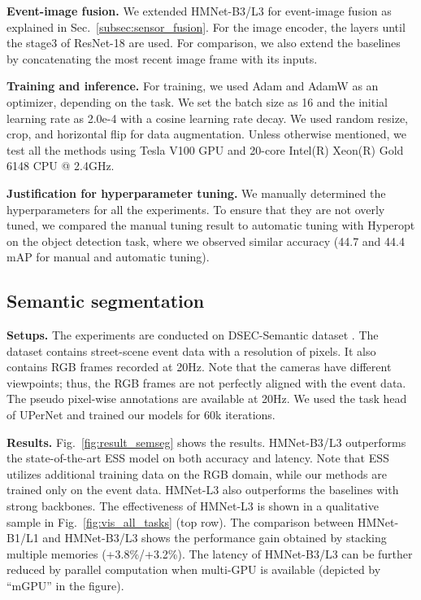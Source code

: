 \vspace{0.1cm}
\noindent
\textbf{Event-image fusion.}
We extended HMNet-B3/L3 for event-image fusion as explained in Sec.~\ref{subsec:sensor_fusion}.
For the image encoder, the layers until the stage3 of ResNet-18 \cite{He2016} are used.
For comparison, we also extend the baselines by concatenating the most recent image frame with its inputs.


\vspace{0.1cm}
\noindent
\textbf{Training and inference.}
For training, we used Adam \cite{Kingma2015} and AdamW \cite{Loshchilov2019} as an optimizer, depending on the task. We set the batch size as 16 and the initial learning rate as 2.0e-4 with a cosine learning rate decay.
We used random resize, crop, and horizontal flip for data augmentation.
Unless otherwise mentioned, we test all the methods using Tesla V100 GPU and 20-core Intel(R) Xeon(R) Gold 6148 CPU @ 2.4GHz.

\vspace{0.1cm}
\noindent
\textbf{Justification for hyperparameter tuning.}
We manually determined the hyperparameters for all the experiments.
To ensure that they are not overly tuned, we compared the manual tuning result to automatic tuning with Hyperopt \cite{Bergstra2013} on the object detection task, where we observed similar accuracy (44.7 and 44.4 mAP for manual and automatic tuning).



\subsection{Semantic segmentation}
\label{sec:semantic_segmentation}

\noindent
\textbf{Setups.}
The experiments are conducted on DSEC-Semantic dataset \cite{Sun2022}.
The dataset contains street-scene event data with a resolution of  pixels.
It also contains RGB frames recorded at 20Hz. Note that the cameras have different viewpoints; thus, the RGB frames are not perfectly aligned with the event data.
The pseudo pixel-wise annotations are available at 20Hz.
We used the task head of UPerNet \cite{Xiao2018} and trained our models for 60k iterations.

\tbSemsegFusion

\figVisAllTasks

\vspace{0.1cm}
\noindent
\textbf{Results.}
Fig.~\ref{fig:result_semseg} shows the results.
HMNet-B3/L3 outperforms the state-of-the-art ESS model \cite{Sun2022} on both accuracy and latency. Note that ESS utilizes additional training data on the RGB domain, while our methods are trained only on the event data.
HMNet-L3 also outperforms the baselines with strong backbones.
The effectiveness of HMNet-L3 is shown in a qualitative sample in Fig.~\ref{fig:vis_all_tasks} (top row).
The comparison between HMNet-B1/L1 and HMNet-B3/L3 shows the performance gain obtained by stacking multiple memories (+3.8\%/+3.2\%).
The latency of HMNet-B3/L3 can be further reduced by parallel computation when multi-GPU is available (depicted by ``mGPU'' in the figure).

